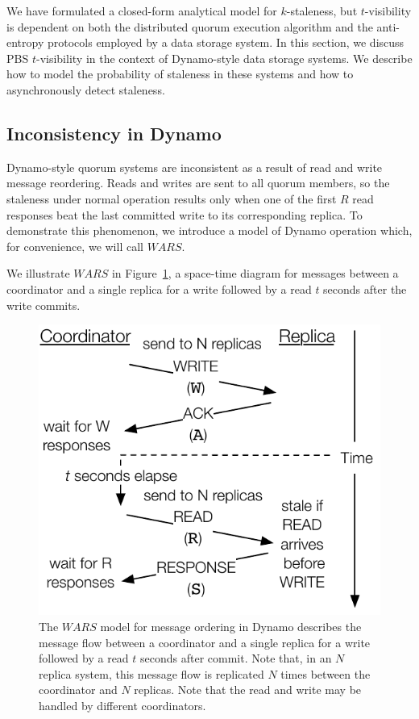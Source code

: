 \documentclass{vldb}
\begin{document}
We have formulated a closed-form analytical model for $k$-staleness,
but $t$-visibility is dependent on both the distributed quorum
execution algorithm and the anti-entropy protocols employed by a data
storage system.  In this section, we discuss PBS $t$-visibility in the
context of Dynamo-style data storage systems.  We describe how to
model the probability of staleness in these systems and how to
asynchronously detect staleness.

\subsection{Inconsistency in Dynamo}

Dynamo-style quorum systems are inconsistent as a result of read and
write message reordering.  Reads and writes are sent to all quorum
members, so the staleness under normal operation results only when one
of the first $R$ read responses beat the last committed write to its
corresponding replica.  To demonstrate this phenomenon, we introduce a
model of Dynamo operation which, for convenience, we will call $WARS$.

We illustrate $WARS$ in Figure~\ref{fig:dynamo-diagram}, a space-time
diagram for messages between a coordinator and a single replica for a
write followed by a read $t$ seconds after the write commits.

\begin{figure}
\centering
\includegraphics[width=.8\columnwidth]{figs/dynamostale.pdf}
\caption{The $WARS$ model for message ordering in Dynamo describes the
  message flow between a coordinator and a single replica for a write
  followed by a read $t$ seconds after commit.  Note that, in an $N$
  replica system, this message flow is replicated $N$ times between
  the coordinator and $N$ replicas.  Note that the read and write may be handled by different coordinators.}
\label{fig:dynamo-diagram}
\end{figure}
\end{document}
